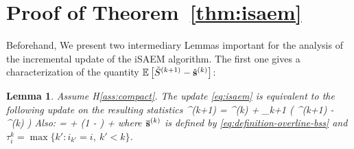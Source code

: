 \documentclass[11pt]{article}
\newtheorem{Lemma}{Lemma}
\theoremstyle{t}
\begin{document}

\section{Proof of Theorem~\ref{thm:isaem}}\label{app:theoremisaem}
Beforehand, We present two intermediary Lemmas important for the analysis of the incremental update of the iSAEM algorithm.
The first one gives a characterization of the quantity $\mathbb{E}\left[\tilde{S}^{(k+1)} - \hat{{\mathbf{s}}}^{(k)}\right]$:
\begin{Lemma}\label{lem:meanfield_isaem}
 Assume H\ref{ass:compact}. The update \eqref{eq:isaem} is equivalent to the following update on the resulting statistics 
\beq
\hat{\bss}^{(k+1)} =  \hat{\bss}^{(k)}  + \gamma_{k+1} \big( ^{(k+1)} - \hat{\bss}^{(k)} \big)
\eeq 
Also:
\beq
\EE{} = \EE{} + \left(1 -  \right) \EE\left[\frac{1}{n} \sum_{i=1}^n \tilde{S}_i^{(\tau_i^k)}- \overline{\bss}^{(k)}\right]  +\EE{}
\eeq
where $\overline{{\mathbf{s}}}^{(k)}$ is defined by \eqref{eq:definition-overline-bss} and $\tau_i^k = \max \{ k' : i_{k'} = i,~k' < k \}$.
\end{Lemma}
\end{document}
